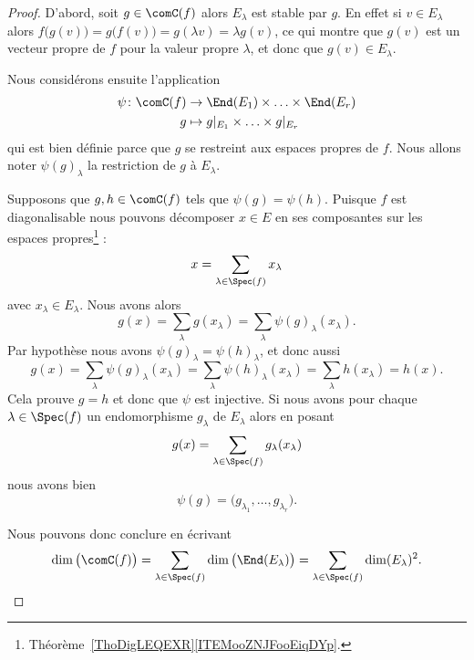 \begin{proof}
	D'abord, soit \( g\in\comC(f)\) alors \( E_{\lambda}\) est stable par \( g\). En effet si \( v\in E_{\lambda}\) alors \( f\big( g(v) \big)=g\big( f(v) \big)=g(\lambda v)=\lambda g(v)\), ce qui montre que \( g(v)\) est un vecteur propre de \( f\) pour la valeur propre \( \lambda\), et donc que \( g(v)\in E_{\lambda}\).

	Nous considérons ensuite l'application
	\begin{equation}
		\begin{aligned}
			\psi\colon \comC(f) & \to \End(E_1)\times \ldots\times \End(E_r)    \\
			g                   & \mapsto  g|_{E_1}\times \ldots\times g|_{E_r}
		\end{aligned}
	\end{equation}
	qui est bien définie parce que \( g\) se restreint aux espaces propres de \( f\). Nous allons noter \( \psi(g)_{\lambda}\) la restriction de \( g\) à \( E_{\lambda}\).
	\begin{subproof}

		Supposons que \( g,h\in\comC(f)\) tels que \( \psi(g)=\psi(h)\). Puisque \( f\) est diagonalisable nous pouvons décomposer \( x\in  E\) en ses composantes sur les espaces propres\footnote{Théorème~\ref{ThoDigLEQEXR}\ref{ITEMooZNJFooEiqDYp}.} :
		\begin{equation}
			x=\sum_{\lambda\in\Spec(f)}x_{\lambda}
		\end{equation}
		avec \( x_{\lambda}\in E_{\lambda}\).  Nous avons alors
		\begin{equation}
			g(x)=\sum_{\lambda}g(x_{\lambda})=\sum_{\lambda}\psi(g)_{\lambda}(x_{\lambda}).
		\end{equation}
		Par hypothèse nous avons \( \psi(g)_{\lambda}=\psi(h)_{\lambda}\), et donc aussi
		\begin{equation}
			g(x)=\sum_{\lambda}\psi(g)_{\lambda}(x_{\lambda})=\sum_{\lambda}\psi(h)_{\lambda}(x_{\lambda})=\sum_{\lambda}h(x_{\lambda})=h(x).
		\end{equation}
		Cela prouve \( g=h\) et donc que \( \psi\) est injective.
		Si nous avons pour chaque \( \lambda\in\Spec(f)\) un endomorphisme \( g_{\lambda}\) de \( E_{\lambda}\) alors en posant
		\begin{equation}
			g(x)=\sum_{\lambda\in\Spec(f)}g_{\lambda}(x_{\lambda})
		\end{equation}
		nous avons bien
		\begin{equation}
			\psi(g)=\big( g_{\lambda_1},\ldots, g_{\lambda_r} \big).
		\end{equation}
	\end{subproof}
	Nous pouvons donc conclure en écrivant
	\begin{equation}
		\dim\big( \comC(f) \big)=\sum_{\lambda\in\Spec(f)}\dim\big( \End(E_{\lambda}) \big)= \sum_{\lambda\in\Spec(f)}\dim(E_{\lambda})^2.
	\end{equation}
\end{proof}

